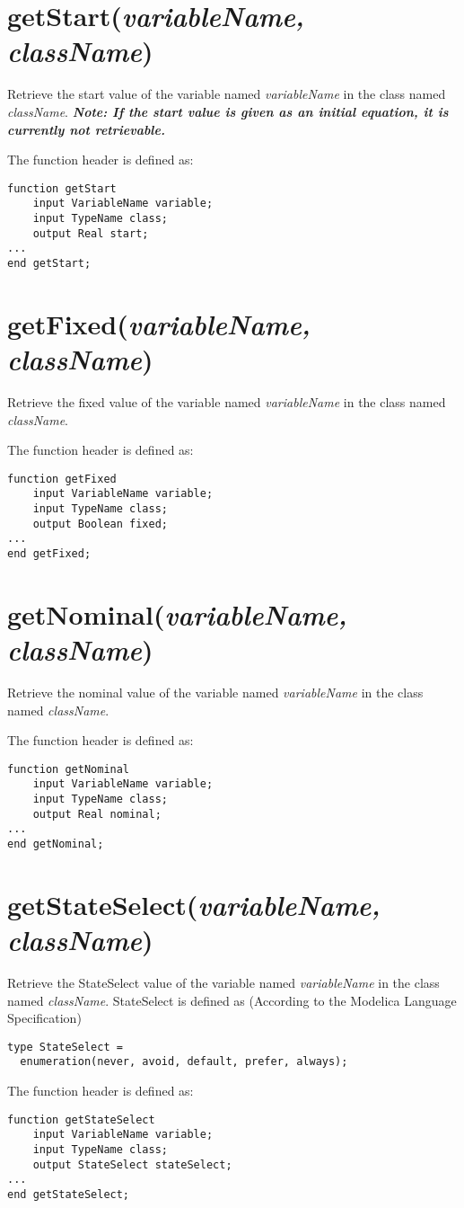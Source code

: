 \documentclass{report}
\newcommand{\func}[1]{\section{#1}}
\newcommand{\funcend}{}
\begin{document}
\func{getStart(\emph{variableName, className})}
Retrieve the start value of the variable named \emph{variableName} in the
class named \emph{className}. \emph{\bf{Note:} If the start value is given
as an initial equation, it is currently not retrievable.}

The function header is defined as:
\begin{verbatim}
function getStart
    input VariableName variable;
    input TypeName class;
    output Real start;
...
end getStart;
\end{verbatim}

\func{getFixed(\emph{variableName, className})}
Retrieve the fixed value of the variable named \emph{variableName} in the
class named \emph{className}. 

The function header is defined as:
\begin{verbatim}
function getFixed
    input VariableName variable;
    input TypeName class;
    output Boolean fixed;
...
end getFixed;
\end{verbatim}

\func{getNominal(\emph{variableName, className})}
Retrieve the nominal value of the variable named \emph{variableName} in the
class named \emph{className}. 

The function header is defined as:
\begin{verbatim}
function getNominal
    input VariableName variable;
    input TypeName class;
    output Real nominal;
...
end getNominal;
\end{verbatim}

\func{getStateSelect(\emph{variableName, className})}
Retrieve the StateSelect value of the variable named
\emph{variableName} in the class named \emph{className}. StateSelect
is defined as (According to the Modelica Language Specification)
\begin{verbatim}
type StateSelect = 
  enumeration(never, avoid, default, prefer, always);
\end{verbatim}

The function header is defined as:
\begin{verbatim}
function getStateSelect
    input VariableName variable;
    input TypeName class;
    output StateSelect stateSelect;
...
end getStateSelect;
\end{verbatim}

\funcend
\end{document}
